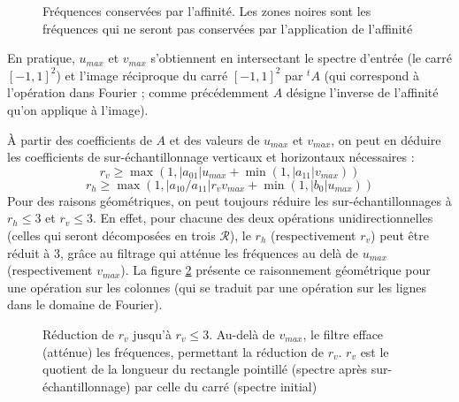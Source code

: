 \begin{figure}
		\caption{Fréquences conservées par l'affinité. Les zones noires sont les fréquences qui ne seront pas conservées par l'application de l'affinité}
		\label{uMax_vMax}
		\end{figure}
		
		En pratique, $u_{max}$ et $v_{max}$ s'obtiennent en intersectant le spectre d'entrée (le carré $[-1,1]^2$) et l'image réciproque du carré $[-1,1]^2$ par $^t\!A$ (qui correspond à l'opération dans Fourier ; comme précédemment $A$ désigne l'inverse de l'affinité qu'on applique à l'image).
		
		À partir des coefficients de $A$ et des valeurs de $u_{max}$ et $v_{max}$, on peut en déduire les coefficients de sur-échantillonnage verticaux et horizontaux nécessaires \cite{szeliski2010high} :
		\[r_v \geq \max (1,|a_{01}|u_{max}+\min (1,|a_{11}|v_{max}))\]
		\[r_h \geq \max (1,|a_{10}/a_{11}|r_vv_{max}+\min (1,|b_0|u_{max}))\]
		Pour des raisons géométriques, on peut toujours réduire les sur-échantillonnages à $r_h \leq 3$ et $r_v \leq 3$. En effet, pour chacune des deux opérations unidirectionnelles (celles qui seront décomposées en trois $\mathcal R$), le $r_h$ (respectivement $r_v$) peut être réduit à 3, grâce au filtrage qui atténue les fréquences au delà de $u_{max}$ (respectivement $v_{max}$). La figure \ref{rvleq3} présente ce raisonnement géométrique pour une opération sur les colonnes (qui se traduit par une opération sur les lignes dans le domaine de Fourier).
		
		\begin{figure}
		\centering
		\caption{Réduction de $r_v$ jusqu'à $r_v \leq 3$. Au-delà de $v_{max}$, le filtre efface (atténue) les fréquences, permettant la réduction de $r_v$. $r_v$ est le quotient de la longueur du rectangle pointillé (spectre après sur-échantillonnage) par celle du carré (spectre initial)}
		\label{rvleq3}
		\end{figure}
		
